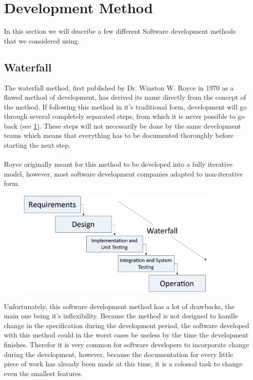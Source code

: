 \section{Development Method}
\label{sec:DevelopmentMethods}
In this section we will describe a few different Software development methods that we considered using.

\subsection{Waterfall}
The waterfall method, first published by Dr. Winston W. Royce in 1970 as a flawed method of development, has derived its name directly from the concept of the method. If following this method in it's traditional form, development will go through several completely separated steps, from which it is never possible to go back (see \ref{fig:WaterfallPic}). These steps will not necessarily be done by the same development teams which means that everything has to be documented thoroughly before starting the next step.\\
 \\
Royce originally meant for this method to be developed into a fully iterative model, however, most software development companies adapted to non-iterative form.
\cite{waterfallroyce}

\begin{figure}[H]
	\centering
		\includegraphics[width=0.90\textwidth]{input/implementation/development/waterfall.pdf}
	\label{fig:WaterfallPic}
\end{figure}

Unfortunately, this software development method has a lot of drawbacks, the main one being it's inflexibility. Because the method is not designed to handle change in the specification during the development period, the software developed with this method could in the worst cases be useless by the time the development finishes. Therefor it is very common for software developers to incorporate change during the development, however, because the documentation for every little piece of work has already been made at this time, it is a colossal task to change even the smallest features. 


